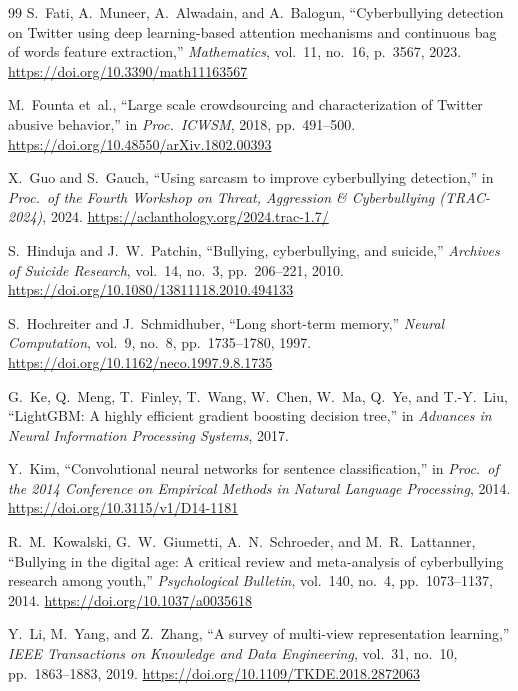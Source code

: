 \documentclass[10pt,twocolumn,a4paper]{article}
\begin{document}
\begin{thebibliography}{99}
S.~Fati, A.~Muneer, A.~Alwadain, and A.~Balogun, ``Cyberbullying detection on Twitter using deep learning-based attention mechanisms and continuous bag of words feature extraction,'' \textit{Mathematics}, vol.~11, no.~16, p.~3567, 2023. \url{https://doi.org/10.3390/math11163567}

M.~Founta et~al., ``Large scale crowdsourcing and characterization of Twitter abusive behavior,'' in \textit{Proc.\ ICWSM}, 2018, pp.~491--500. \url{https://doi.org/10.48550/arXiv.1802.00393}

X.~Guo and S.~Gauch, ``Using sarcasm to improve cyberbullying detection,'' in \textit{Proc.\ of the Fourth Workshop on Threat, Aggression \& Cyberbullying (TRAC-2024)}, 2024. \url{https://aclanthology.org/2024.trac-1.7/}

S.~Hinduja and J.~W.~Patchin, ``Bullying, cyberbullying, and suicide,'' \textit{Archives of Suicide Research}, vol.~14, no.~3, pp.~206--221, 2010. \url{https://doi.org/10.1080/13811118.2010.494133}

S.~Hochreiter and J.~Schmidhuber, ``Long short-term memory,'' \textit{Neural Computation}, vol.~9, no.~8, pp.~1735--1780, 1997. \url{https://doi.org/10.1162/neco.1997.9.8.1735}

G.~Ke, Q.~Meng, T.~Finley, T.~Wang, W.~Chen, W.~Ma, Q.~Ye, and T.-Y.~Liu, ``LightGBM: A highly efficient gradient boosting decision tree,'' in \textit{Advances in Neural Information Processing Systems}, 2017.

Y.~Kim, ``Convolutional neural networks for sentence classification,'' in \textit{Proc.\ of the 2014 Conference on Empirical Methods in Natural Language Processing}, 2014. \url{https://doi.org/10.3115/v1/D14-1181}

R.~M.~Kowalski, G.~W.~Giumetti, A.~N.~Schroeder, and M.~R.~Lattanner, ``Bullying in the digital age: A critical review and meta-analysis of cyberbullying research among youth,'' \textit{Psychological Bulletin}, vol.~140, no.~4, pp.~1073--1137, 2014. \url{https://doi.org/10.1037/a0035618}

Y.~Li, M.~Yang, and Z.~Zhang, ``A survey of multi-view representation learning,'' \textit{IEEE Transactions on Knowledge and Data Engineering}, vol.~31, no.~10, pp.~1863--1883, 2019. \url{https://doi.org/10.1109/TKDE.2018.2872063}


\end{thebibliography}
\end{document}
